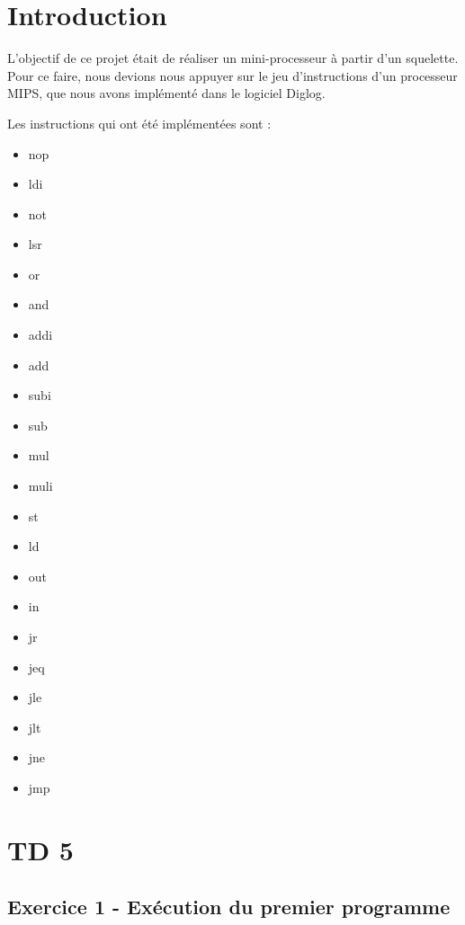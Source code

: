 \documentclass[twoside, 12pt, a4paper]{article}
\begin{document}
\maketitle

\newpage

\section*{Introduction}

L’objectif de ce projet était de réaliser un mini-processeur à partir d'un squelette. Pour ce faire, nous devions
nous appuyer sur le jeu d’instructions d’un processeur MIPS, que nous avons implémenté dans
le logiciel Diglog.

Les instructions qui ont été implémentées sont :
{
\ttfamily
\begin{itemize}
    \item nop
    \item ldi
    \item not
    \item lsr
    \item or
    \item and
    \item addi
    \item add
    \item subi
    \item sub
    \item mul
    \item muli
    \item st
    \item ld
    \item out
    \item in
    \item jr
    \item jeq
    \item jle
    \item jlt
    \item jne
    \item jmp
\end{itemize}
}
\newpage

\tableofcontents

\newpage

\section{TD 5}
    \subsection{Exercice 1 - Exécution du premier programme}
\end{document}
